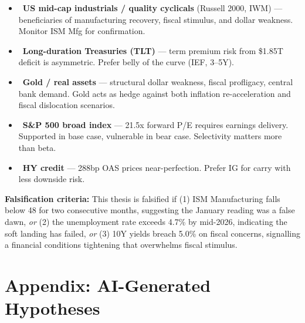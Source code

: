 \documentclass{wilson-report}
\begin{document}
\begin{itemize}[leftmargin=1.2em, itemsep=4pt]
  \item \overweight\ \textbf{US mid-cap industrials / quality cyclicals} (Russell 2000, IWM) --- beneficiaries of manufacturing recovery, fiscal stimulus, and dollar weakness. Monitor ISM Mfg for confirmation.
  \item \underweight\ \textbf{Long-duration Treasuries (TLT)} --- term premium risk from \$1.85T deficit is asymmetric. Prefer belly of the curve (IEF, 3--5Y).
  \item \overweight\ \textbf{Gold / real assets} --- structural dollar weakness, fiscal profligacy, central bank demand. Gold acts as hedge against both inflation re-acceleration and fiscal dislocation scenarios.
  \item \neutralweight\ \textbf{S\&P 500 broad index} --- 21.5x forward P/E requires earnings delivery. Supported in base case, vulnerable in bear case. Selectivity matters more than beta.
  \item \underweight\ \textbf{HY credit} --- 288bp OAS prices near-perfection. Prefer IG for carry with less downside risk.
\end{itemize}

\textbf{Falsification criteria:} This thesis is falsified if (1) ISM Manufacturing falls below 48 for two consecutive months, suggesting the January reading was a false dawn, \textit{or} (2) the unemployment rate exceeds 4.7\% by mid-2026, indicating the soft landing has failed, \textit{or} (3) 10Y yields breach 5.0\% on fiscal concerns, signalling a financial conditions tightening that overwhelms fiscal stimulus.

\section*{Appendix: AI-Generated Hypotheses}

\end{document}
